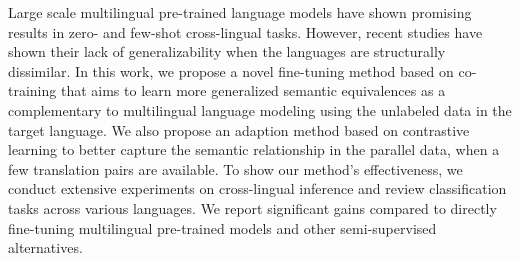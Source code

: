 Large scale multilingual pre-trained language models have shown promising results in zero- and few-shot cross-lingual tasks. However, recent studies have shown their lack of generalizability when the languages are structurally dissimilar. In this work, we propose a novel fine-tuning method based on co-training that aims to learn more generalized semantic equivalences as a complementary to multilingual language modeling using the unlabeled data in the target language.  We also propose an adaption method based on contrastive learning to better capture the semantic relationship in the parallel data, when a few translation pairs are available. To show our method's effectiveness, we conduct extensive experiments on cross-lingual inference and review classification tasks across various languages. We report significant gains compared to directly fine-tuning multilingual pre-trained models and other semi-supervised alternatives.
